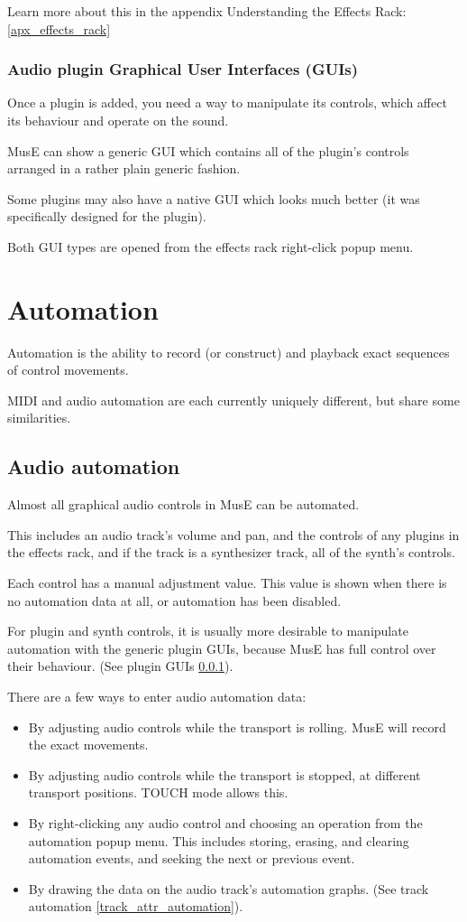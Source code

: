 \documentclass[a4paper]{report}
\begin{document}
Learn more about this in the appendix Understanding the Effects Rack:
\ref{apx_effects_rack}

\subsubsection{Audio plugin Graphical User Interfaces (GUIs)} 
\label{plugin_guis} Once a plugin is added, you need a way to 
manipulate its controls, which affect its behaviour and operate
on the sound.

MusE can show a generic GUI which contains all of the
plugin's controls arranged in a rather plain generic fashion.

Some plugins may also have a native GUI which looks much better (it
was specifically designed for the plugin).

Both GUI types are opened from the effects rack right-click popup menu.

\section{Automation} \label{automation}
Automation is the ability to record (or construct) and playback
exact sequences of control movements.

MIDI and audio automation are each currently uniquely different,
but share some similarities.

\subsection{Audio automation} \label{audio_automation}
Almost all graphical audio controls in MusE can be automated.

This includes an audio track's volume and pan, and the controls
of any plugins in the effects rack, and if the track is a
synthesizer track, all of the synth's controls.

Each control has a manual adjustment value. This value is shown
when there is no automation data at all, or automation has been
disabled.

For plugin and synth controls, it is usually more desirable to
manipulate automation with the generic plugin GUIs, because
MusE has full control over their behaviour. (See plugin GUIs
\ref{plugin_guis}).

There are a few ways to enter audio automation data:
\begin{itemize}
\item By adjusting audio controls while the transport is rolling.
MusE will record the exact movements.
\item By adjusting audio controls while the transport is stopped,
at different transport positions. TOUCH mode allows this.
\item By right-clicking any audio control and choosing an operation
from the automation popup menu. This includes storing, erasing,
and clearing automation events, and seeking the next or previous
event.
\item By drawing the data on the audio track's automation graphs.
(See track automation \ref{track_attr_automation}).
\end{itemize}
\end{document}
